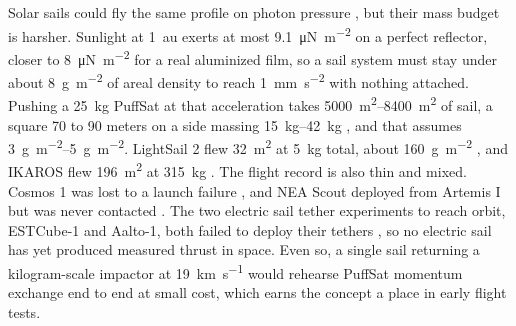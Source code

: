 \documentclass{article}
\begin{document}
Solar sails could fly the same profile on photon pressure \cite{mcinnes1999solar_sailing}, but their mass budget is harsher. Sunlight at \SI{1}{\astronomicalunit} exerts at most \SI{9.1}{\micro\newton\per\square\meter} on a perfect reflector, closer to \SI{8}{\micro\newton\per\square\meter} for a real aluminized film, so a sail system must stay under about \SI{8}{\gram\per\square\meter} of areal density to reach \SI{1}{\milli\meter\per\second\squared} with nothing attached. Pushing a \SI{25}{\kilo\gram} PuffSat at that acceleration takes \SIrange{5000}{8400}{\square\meter} of sail, a square 70 to 90 meters on a side massing \SIrange{15}{42}{\kilo\gram} \cite{katz_esail_sim_2026}, and that assumes \SIrange{3}{5}{\gram\per\square\meter}. LightSail 2 flew \SI{32}{\square\meter} at \SI{5}{\kilo\gram} total, about \SI{160}{\gram\per\square\meter} \cite{spencer2021lightsail2}, and IKAROS flew \SI{196}{\square\meter} at \SI{315}{\kilo\gram} \cite{tsuda2011ikaros}. The flight record is also thin and mixed. Cosmos 1 was lost to a launch failure \cite{cosmos1_2005_loss}, and NEA Scout deployed from Artemis I but was never contacted \cite{neascout2022lost}. The two electric sail tether experiments to reach orbit, ESTCube-1 and Aalto-1, both failed to deploy their tethers \cite{slavinskis2015estcube1, praks2021aalto1}, so no electric sail has yet produced measured thrust in space. Even so, a single sail returning a kilogram-scale impactor at \SI{19}{\kilo\meter\per\second} would rehearse PuffSat momentum exchange end to end at small cost, which earns the concept a place in early flight tests.
\end{document}
